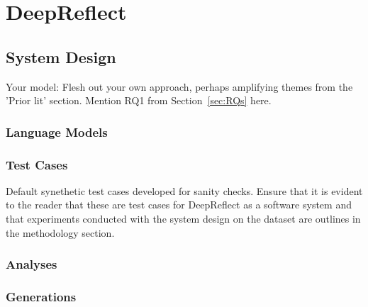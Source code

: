 
\section{DeepReflect}

\subsection{System Design}\label{sec:deepreflect}
\textcolor{black!40}{Your model: Flesh out your own approach, perhaps amplifying themes from the 'Prior lit' section. Mention RQ1 from Section~\ref{sec:RQs} here.}
\subsubsection{Language Models}

\subsubsection{Test Cases}
\textcolor{black!40}{Default synethetic test cases developed for sanity checks.}
\textcolor{black!40}{Ensure that it is evident to the reader that these are test cases for DeepReflect as a software system and that experiments conducted with the system design on the dataset are outlines in the methodology section.}
\textcolor{black!30}{\lipsum[9-10]}

\subsubsection{Analyses}
\textcolor{black!30}{\lipsum[8-9]}

\subsubsection{Generations}

